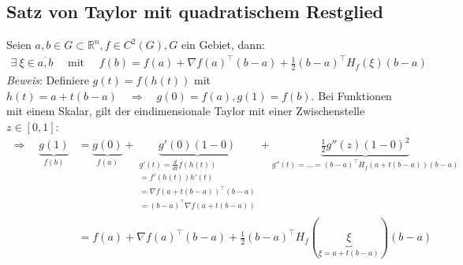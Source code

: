 \documentclass[11pt,a4paper]{book}
\newcommand {\Rn}	{\mathbb{R}^n}
\newcommand{\1}    	{\mathbbm{1}}
\newcommand{\mitt}	{\textrm{ mit }}
\begin{document}
\subsection{Satz von Taylor mit quadratischem Restglied}
Seien \(a,b \in G \subset \Rn, f \in C^2(G), G\) ein Gebiet, dann:
\begin{align*}
	\exists~ \xi \in \overline{a,b} \quad\mitt\quad f(b) = f(a) + \nabla f(a)^\top (b-a) + \frac{1}{2} (b-a)^\top H_f(\xi)(b-a)
\end{align*}
\textit{Beweis}: Definiere \(g(t) = f(h(t))\) mit \(h(t) = a + t(b-a) \quad\Rightarrow\quad g(0) = f(a), g(1) = f(b)\). Bei Funktionen mit einem Skalar, gilt der eindimensionale Taylor mit einer Zwischenstelle \(z \in [0,1]\):
\begin{align*}
	\Rightarrow \quad \underbrace{g(1)}_{f(b)} &= \underbrace{g(0)}_{f(a)} + 
	\underbrace{g'(0)(1-0)}_{\substack{
		g'(t) = \frac{d}{dt} f(h(t)) \\
		= f'(h(t))h'(t) \\
		= \nabla f(a + t(b-a))^\top (b-a) \\
		= (b-a)^\top \nabla f(a + t(b-a)) 
	}} + 
	\underbrace{\frac{1}{2} g''(z)(1-0)^2}_{
		g''(t) = ... = (b-a)^\top H_f(a + t(b-a))(b-a)
	} \\
	&= f(a) + \nabla f(a)^\top (b-a) + \frac{1}{2} (b-a)^\top H_f(\underbrace{\xi}_{\xi = a + t(b-a)})(b-a)
\end{align*}
\end{document}
